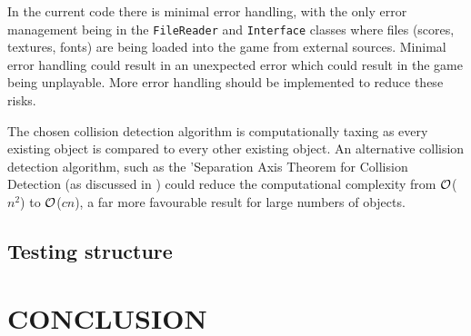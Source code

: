 \documentclass[10pt,twocolumn]{witseiepaper}
\begin{document}
In the current code there is minimal error handling, with the only error management being in the \texttt{FileReader} and \texttt{Interface} classes where files (scores, textures, fonts) are being loaded into the game from external sources. Minimal error handling could result in an unexpected error which could result in the game being unplayable. More error handling should be implemented to reduce these risks.

The chosen collision detection algorithm is computationally taxing as every existing object is compared to every other existing object. An alternative collision detection algorithm, such as the 'Separation Axis Theorem for Collision Detection (as discussed in \cite{Collision_detection}) could reduce the computational complexity from $\cal{O}$($n^{2}$) to $\cal{O}$($cn$), a far more favourable result for large numbers of objects.


\subsection{Testing structure}





\section{CONCLUSION}

%



\end{document}
